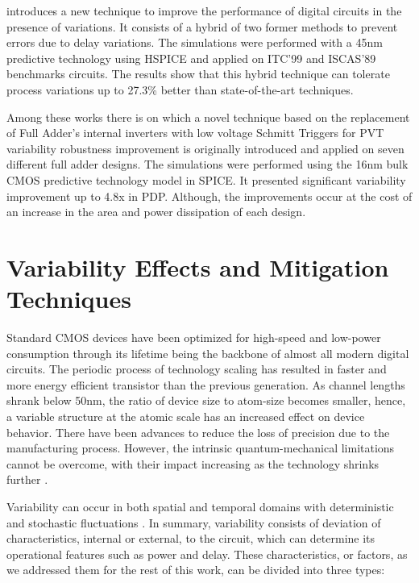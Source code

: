 \documentclass[ecp,tc, english]{iiufrgs}
\begin{document}
\cite{ahmadi2017hybrid} introduces a new technique to improve the performance of digital circuits in the presence of variations. It consists of a hybrid of two former methods to prevent errors due to delay variations. The simulations were performed with a 45nm predictive technology using HSPICE and applied on ITC’99 and ISCAS’89 benchmarks circuits. The results show that this hybrid technique can tolerate process variations up to 27.3\% better than state-of-the-art techniques.

Among these works there is \cite{dokania2015circuit} on which a novel technique based on the replacement of Full Adder’s internal inverters with low voltage Schmitt Triggers for PVT variability robustness improvement is originally introduced and applied on seven different full adder designs. The simulations were performed using the 16nm bulk CMOS predictive technology model in SPICE. It presented significant variability improvement up to 4.8x in PDP. Although, the improvements occur at the cost of an increase in the area and power dissipation of each design.  



\chapter{Variability Effects and Mitigation Techniques}

Standard CMOS devices have been optimized for high-speed and low-power consumption through its lifetime being the backbone of almost all modern digital circuits. The periodic process of technology scaling has resulted in faster and more energy efficient transistor than the previous generation. As channel lengths shrank below 50nm, the ratio of device size to atom-size becomes smaller, hence, a variable structure at the atomic scale has an increased effect on device behavior. There have been advances to reduce the loss of precision due to the manufacturing process. However, the intrinsic quantum-mechanical limitations cannot be overcome, with their impact increasing as the technology shrinks further \cite{asenov1999random}. 

Variability can occur in both spatial and temporal domains with deterministic and stochastic fluctuations \cite{walker2010optimizing}. In summary, variability consists of deviation of characteristics, internal or external, to the circuit, which can determine its operational features such as power and delay. These characteristics, or factors, as we addressed them for the rest of this work, can be divided into three types: 
 
\end{document}
